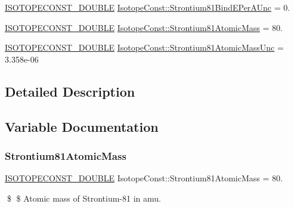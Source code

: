 \begin{DoxyCompactItemize}
\mbox{\hyperlink{group___isotope_const-_macros_ga8f45a7272ce02c0b4c65c44636ed719a}{I\+S\+O\+T\+O\+P\+E\+C\+O\+N\+S\+T\+\_\+\+D\+O\+U\+B\+LE}} \mbox{\hyperlink{group___isotope_const-_strontium-_sr81_ga1c41b863261ceeebcc20d7ef73fae4ab}{Isotope\+Const\+::\+Strontium81\+Bind\+E\+Per\+A\+Unc}} = 0.
\item 
\mbox{\hyperlink{group___isotope_const-_macros_ga8f45a7272ce02c0b4c65c44636ed719a}{I\+S\+O\+T\+O\+P\+E\+C\+O\+N\+S\+T\+\_\+\+D\+O\+U\+B\+LE}} \mbox{\hyperlink{group___isotope_const-_strontium-_sr81_ga410d09ed895a8a40976a962b7fd90c61}{Isotope\+Const\+::\+Strontium81\+Atomic\+Mass}} = 80.
\item 
\mbox{\hyperlink{group___isotope_const-_macros_ga8f45a7272ce02c0b4c65c44636ed719a}{I\+S\+O\+T\+O\+P\+E\+C\+O\+N\+S\+T\+\_\+\+D\+O\+U\+B\+LE}} \mbox{\hyperlink{group___isotope_const-_strontium-_sr81_ga699da062d5dd611a16e50341ba31b416}{Isotope\+Const\+::\+Strontium81\+Atomic\+Mass\+Unc}} = 3.\+358e-\/06
\end{DoxyCompactItemize}


\subsection{Detailed Description}


\subsection{Variable Documentation}
\mbox{\label{group___isotope_const-_strontium-_sr81_ga410d09ed895a8a40976a962b7fd90c61}} 
\subsubsection{\texorpdfstring{Strontium81\+Atomic\+Mass}{Strontium81AtomicMass}}
{\footnotesize\ttfamily \mbox{\hyperlink{group___isotope_const-_macros_ga8f45a7272ce02c0b4c65c44636ed719a}{I\+S\+O\+T\+O\+P\+E\+C\+O\+N\+S\+T\+\_\+\+D\+O\+U\+B\+LE}} Isotope\+Const\+::\+Strontium81\+Atomic\+Mass = 80.}

\$ \$ Atomic mass of Strontium-\/81 in amu. \mbox{\label{group___isotope_const-_strontium-_sr81_ga699da062d5dd611a16e50341ba31b416}} 
